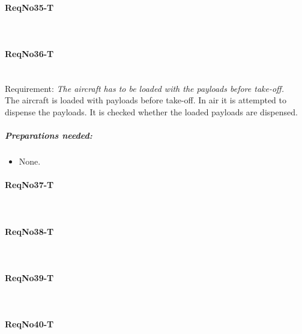 \paragraph{ReqNo35-T}\mbox{}\\ %


\paragraph{ReqNo36-T}\mbox{}\\ %
Requirement: \textit{The aircraft has to be loaded with the payloads before take-off.}
\\
The aircraft is loaded with payloads before take-off. In air it is attempted to dispense the payloads. It is checked whether the loaded payloads are dispensed.
\\
	\subparagraph{Preparations needed:}
	\begin{itemize}
	\item None.
	\end{itemize} 

\paragraph{ReqNo37-T}\mbox{}\\ %


\paragraph{ReqNo38-T}\mbox{}\\ %

\paragraph{ReqNo39-T}\mbox{}\\ %

\paragraph{ReqNo40-T}\mbox{}\\ %